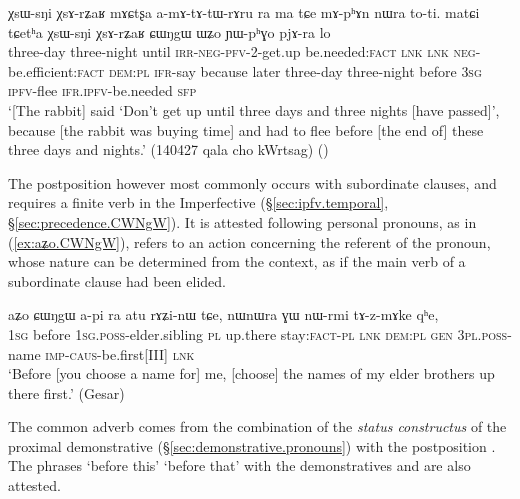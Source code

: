 \begin{exe}
\ex \label{ex:XsArZaR.CWNgW}
 \gll χsɯ-sŋi χsɤ-rʑaʁ mɤɕtʂa a-mɤ-tɤ-tɯ-rɤru ra ma tɕe mɤ-pʰɤn nɯra to-ti. matɕi tɕetʰa χsɯ-sŋi χsɤ-rʑaʁ ɕɯŋgɯ ɯʑo ɲɯ-pʰɣo pjɤ-ra lo \\
 three-day  three-night until \textsc{irr}-\textsc{neg}-\textsc{pfv}-2-get.up be.needed:\textsc{fact} \textsc{lnk} \textsc{lnk}  \textsc{neg}-be.efficient:\textsc{fact} \textsc{dem}:\textsc{pl} \textsc{ifr}-say because later   three-day  three-night before \textsc{3sg} \textsc{ipfv}-flee \textsc{ifr}.\textsc{ipfv}-be.needed \textsc{sfp} \\
 \glt `[The rabbit] said `Don't get up until three days and three nights [have passed]', because [the rabbit was buying time] and had to flee before [the end of] these three days and nights.' (140427 qala cho kWrtsag)
()
\end{exe}

The postposition    however most commonly occurs with subordinate clauses, and requires a finite verb in the Imperfective (§\ref{sec:ipfv.temporal}, §\ref{sec:precedence.CWNgW}). It is attested following personal pronouns, as in (\ref{ex:aʑo.CWNgW}),   refers to an action concerning the referent of the pronoun, whose nature can be determined from the context, as if the main verb of a subordinate clause had been elided.

\begin{exe}
\ex \label{ex:aʑo.CWNgW}
 \gll  aʑo ɕɯŋgɯ a-pi ra atu rɤʑi-nɯ tɕe, nɯnɯra ɣɯ nɯ-rmi tɤ-z-mɤke qʰe, \\
 \textsc{1sg} before \textsc{1sg}.\textsc{poss}-elder.sibling \textsc{pl} up.there stay:\textsc{fact}-\textsc{pl} \textsc{lnk} \textsc{dem}:\textsc{pl} \textsc{gen} \textsc{3pl}.\textsc{poss}-name \textsc{imp}-\textsc{caus}-be.first[III] \textsc{lnk} \\
 \glt `Before [you choose a name for] me, [choose] the names of my elder brothers up there first.' (Gesar)
\end{exe}


The common adverb  comes from the combination of the \textit{status constructus} of the proximal demonstrative  (§\ref{sec:demonstrative.pronouns}) with the postposition . The phrases  `before this'  `before that' with the demonstratives  and   are also attested.

